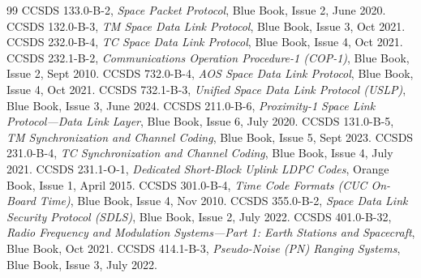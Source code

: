 \documentclass[10pt,a4paper]{article}
\renewcommand{\_}{\origunderscore\penalty0\hskip0pt\relax}
\numberwithin{table}{section}
\numberwithin{figure}{section}
\numberwithin{equation}{section}
\begin{document}
\begin{thebibliography}{99}
\footnotesize\setlength{\itemsep}{1.2pt}
 CCSDS 133.0-B-2, \emph{Space Packet Protocol}, Blue Book, Issue 2, June 2020.
 CCSDS 132.0-B-3, \emph{TM Space Data Link Protocol}, Blue Book, Issue 3, Oct 2021.
 CCSDS 232.0-B-4, \emph{TC Space Data Link Protocol}, Blue Book, Issue 4, Oct 2021.
 CCSDS 232.1-B-2, \emph{Communications Operation Procedure-1 (COP-1)}, Blue Book, Issue 2, Sept 2010.
 CCSDS 732.0-B-4, \emph{AOS Space Data Link Protocol}, Blue Book, Issue 4, Oct 2021.
 CCSDS 732.1-B-3, \emph{Unified Space Data Link Protocol (USLP)}, Blue Book, Issue 3, June 2024.
 CCSDS 211.0-B-6, \emph{Proximity-1 Space Link Protocol---Data Link Layer}, Blue Book, Issue 6, July 2020.
 CCSDS 131.0-B-5, \emph{TM Synchronization and Channel Coding}, Blue Book, Issue 5, Sept 2023.
 CCSDS 231.0-B-4, \emph{TC Synchronization and Channel Coding}, Blue Book, Issue 4, July 2021.
 CCSDS 231.1-O-1, \emph{Dedicated Short-Block Uplink LDPC Codes}, Orange Book, Issue 1, April 2015.
 CCSDS 301.0-B-4, \emph{Time Code Formats (CUC On-Board Time)}, Blue Book, Issue 4, Nov 2010.
 CCSDS 355.0-B-2, \emph{Space Data Link Security Protocol (SDLS)}, Blue Book, Issue 2, July 2022.
 CCSDS 401.0-B-32, \emph{Radio Frequency and Modulation Systems---Part 1: Earth Stations and Spacecraft}, Blue Book, Oct 2021.
 CCSDS 414.1-B-3, \emph{Pseudo-Noise (PN) Ranging Systems}, Blue Book, Issue 3, July 2022.
\end{thebibliography}
\end{document}
